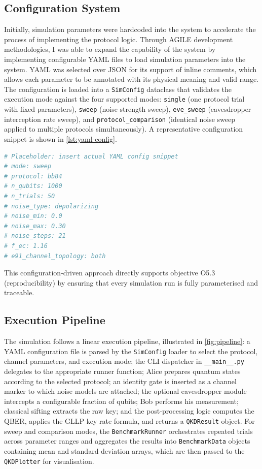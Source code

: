 \subsection{Configuration System}
Initially, simulation parameters were hardcoded into the system to accelerate the process of implementing the protocol logic. Through AGILE development methodologies, I was able to expand the capability of the system by implementing configurable YAML files to load simulation parameters into the system. YAML was selected over JSON for its support of inline comments, which allows each parameter to be annotated with its physical meaning and valid range. The configuration is loaded into a \texttt{SimConfig} dataclass that validates the execution mode against the four supported modes: \texttt{single} (one protocol trial with fixed parameters), \texttt{sweep} (noise strength sweep), \texttt{eve\_sweep} (eavesdropper interception rate sweep), and \texttt{protocol\_comparison} (identical noise sweep applied to multiple protocols simultaneously). A representative configuration snippet is shown in \cref{lst:yaml-config}.

\begin{lstlisting}[language=Python, caption={Example YAML configuration for a BB84 noise sweep}, label={lst:yaml-config}]
# Placeholder: insert actual YAML config snippet
# mode: sweep
# protocol: bb84
# n_qubits: 1000
# n_trials: 50
# noise_type: depolarizing
# noise_min: 0.0
# noise_max: 0.30
# noise_steps: 21
# f_ec: 1.16
# e91_channel_topology: both
\end{lstlisting}

This configuration-driven approach directly supports objective O5.3 (reproducibility) by ensuring that every simulation run is fully parameterised and traceable.

\subsection{Execution Pipeline}

The simulation follows a linear execution pipeline, illustrated in \cref{fig:pipeline}: a YAML configuration file is parsed by the \texttt{SimConfig} loader to select the protocol, channel parameters, and execution mode; the CLI dispatcher in \texttt{\_\_main\_\_.py} delegates to the appropriate runner function; Alice prepares quantum states according to the selected protocol; an identity gate is inserted as a channel marker to which noise models are attached; the optional eavesdropper module intercepts a configurable fraction of qubits; Bob performs his measurement; classical sifting extracts the raw key; and the post-processing logic computes the QBER, applies the GLLP key rate formula, and returns a \texttt{QKDResult} object. For sweep and comparison modes, the \texttt{BenchmarkRunner} orchestrates repeated trials across parameter ranges and aggregates the results into \texttt{BenchmarkData} objects containing mean and standard deviation arrays, which are then passed to the \texttt{QKDPlotter} for visualisation.

